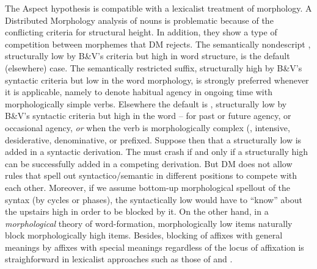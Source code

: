 \documentclass[output=paper,
modfonts
]{LSP/langsci}
\def\urf#1{$^{\textrm{\scriptsize{#1}}}$}
\begin{document}
The Aspect hypothesis is compatible with a lexicalist treatment of morphology.  A Distributed
Morphology analysis of   nouns is problematic because of the conflicting criteria for
structural height.  In addition, they show a type of competition between morphemes that DM
rejects.  The semantically nondescript \form{-tár-\urf{N}}, structurally low by B\&V's
criteria but high in word structure, is the default (elsewhere) case.  The semantically
restricted \form{′-tar-\urf{V}} suffix, structurally high by B\&V's syntactic criteria but
low in the word morphology, is strongly preferred whenever it is applicable, namely to denote
habitual agency in ongoing time with morphologically simple verbs.  Elsewhere the default is
\form{-tár-\urf{N}}, structurally low by B\&V's syntactic criteria but high in the word
 – for past or future agency, or occasional agency, \textit{or} when the
verb is morphologically complex (, intensive, desiderative, denominative, or prefixed.
Suppose then that a structurally low  is added in a syntactic derivation.  The 
must crash if and only if a structurally high  can be successfully added in a competing
derivation.  But DM does not allow rules that spell out syntactico/semantic  in
different positions to compete with each other.  Moreover, if we assume bottom-up morphological
spellout of the syntax (by cycles or phases), the syntactically low  would have to
``know'' about the upstairs high  in order to be blocked by it.  On the other hand, in a
\textit{morphological} theory of word-formation, morphologically low items naturally block
morphologically high items.  Besides, blocking of affixes with general meanings by affixes with
special meanings regardless of the locus of affixation is straighforward in lexicalist
approaches such as those of \citet{wunderlich1996k,wunderlich2001k} and \citet{kiparsky2005}.
\end{document}
